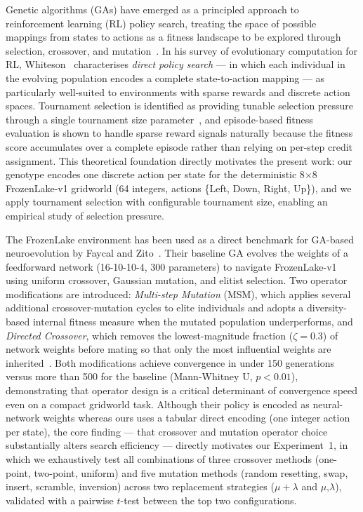 \documentclass[conference]{IEEEtran}
\begin{document}
Genetic algorithms (GAs) have emerged as a principled approach
to reinforcement learning (RL) policy search, treating the space
of possible mappings from states to actions as a fitness landscape
to be explored through selection, crossover, and mutation~\cite{b1}.
In his survey of evolutionary computation for RL,
Whiteson~\cite{b1} characterises \textit{direct policy search} ---
in which each individual in the evolving population encodes a
complete state-to-action mapping --- as particularly well-suited
to environments with sparse rewards and discrete action spaces.
Tournament selection is identified as providing tunable selection
pressure through a single tournament size parameter~\cite{b1},
and episode-based fitness evaluation is shown to handle sparse
reward signals naturally because the fitness score accumulates
over a complete episode rather than relying on per-step credit
assignment.
This theoretical foundation directly motivates the present work:
our genotype encodes one discrete action per state for the
deterministic 8$\times$8 FrozenLake-v1 gridworld (64 integers,
actions \{Left, Down, Right, Up\}), and we apply tournament
selection with configurable tournament size, enabling an
empirical study of selection pressure.

The FrozenLake environment has been used as a direct benchmark
for GA-based neuroevolution by Faycal and Zito~\cite{b2}.
Their baseline GA evolves the weights of a feedforward network
(16-10-10-4, 300 parameters) to navigate FrozenLake-v1 using
uniform crossover, Gaussian mutation, and elitist selection.
Two operator modifications are introduced: \textit{Multi-step
Mutation} (MSM), which applies several additional
crossover-mutation cycles to elite individuals and adopts
a diversity-based internal fitness measure when the mutated
population underperforms, and \textit{Directed Crossover},
which removes the lowest-magnitude fraction ($\zeta = 0.3$)
of network weights before mating so that only the most
influential weights are inherited~\cite{b2}.
Both modifications achieve convergence in under 150 generations
versus more than 500 for the baseline (Mann-Whitney U,
$p < 0.01$), demonstrating that operator design is a critical
determinant of convergence speed even on a compact gridworld
task.
Although their policy is encoded as neural-network weights
whereas ours uses a tabular direct encoding (one integer action
per state), the core finding --- that crossover and mutation
operator choice substantially alters search efficiency ---
directly motivates our Experiment~1, in which we exhaustively
test all combinations of three crossover methods (one-point,
two-point, uniform) and five mutation methods (random resetting,
swap, insert, scramble, inversion) across two replacement
strategies ($\mu{+}\lambda$ and $\mu$,$\lambda$), validated
with a pairwise $t$-test between the top two configurations.
\end{document}
